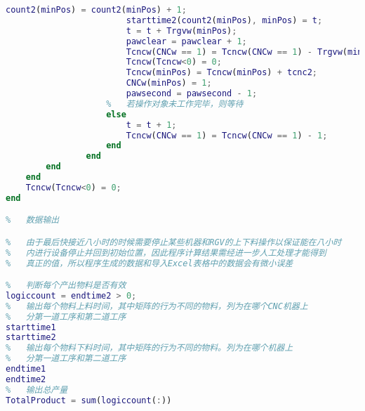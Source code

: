 \documentclass[no-math,withoutpreface,bwprint]{cumcmthesis} %
\numberwithin{equation}{section}
\numberwithin{figure}{section}
\numberwithin{table}{section}
\begin{document}
\begin{lstlisting}[language=matlab]
                        count2(minPos) = count2(minPos) + 1;
                        starttime2(count2(minPos), minPos) = t;
                        t = t + Trgvw(minPos);
                        pawclear = pawclear + 1;
                        Tcncw(CNCw == 1) = Tcncw(CNCw == 1) - Trgvw(minPos);
                        Tcncw(Tcncw<0) = 0;
                        Tcncw(minPos) = Tcncw(minPos) + tcnc2;
                        CNCw(minPos) = 1;
                        pawsecond = pawsecond - 1;
                    %   若操作对象未工作完毕，则等待
                    else
                        t = t + 1;
                        Tcncw(CNCw == 1) = Tcncw(CNCw == 1) - 1;
                    end
                end
        end
    end
    Tcncw(Tcncw<0) = 0;
end    

%   数据输出

%   由于最后快接近八小时的时候需要停止某些机器和RGV的上下料操作以保证能在八小时
%   内进行设备停止并回到初始位置，因此程序计算结果需经进一步人工处理才能得到
%   真正的值，所以程序生成的数据和导入Excel表格中的数据会有微小误差

%   判断每个产出物料是否有效
logiccount = endtime2 > 0;
%   输出每个物料上料时间，其中矩阵的行为不同的物料，列为在哪个CNC机器上
%   分第一道工序和第二道工序
starttime1
starttime2
%   输出每个物料下料时间，其中矩阵的行为不同的物料。列为在哪个机器上
%   分第一道工序和第二道工序
endtime1
endtime2
%   输出总产量
TotalProduct = sum(logiccount(:))
\end{lstlisting}
\end{document}
